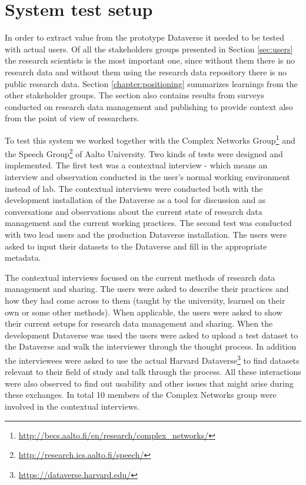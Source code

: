 \section{System test setup}
\label{sec:system_testing}

In order to extract value from the prototype Dataverse it needed to be tested
with actual users. Of all the stakeholders groups presented in Section \ref{sec:users}
the research scientists is the most important one, since without them there is
no research data and without them using the research data repository there is
no public research data. Section \ref{chapter:positioning} summarizes learnings
from the other stakeholder groups. The section also contains results from
surveys conducted on research data management and publishing to provide context
also from the point of view of researchers.

To test this system we worked together with the Complex Networks
Group\footnote{\url{http://becs.aalto.fi/en/research/complex\_networks/}} and the
Speech Group\footnote{\url{http://research.ics.aalto.fi/speech/}} of Aalto
University. Two kinds of tests were designed and implemented. The first test was a contextual
interview - which means an interview and observation conducted in the user's normal working
environment instead of lab. The contextual interviews were conducted both with
the development installation of the Dataverse as a tool for discussion and as
conversations and observations about the current state of research data management and the
current working practices. The second test was conducted with two lead users
and the production Dataverse installation. The users were asked to input their
datasets to the Dataverse and fill in the appropriate metadata.

The contextual interviews focused on the current methods of research data
management and sharing. The users were asked to describe their practices and
how they had come across to them (taught by the university, learned on their
own or some other methods). When applicable, the users were asked to show
their current setups for research data management and sharing. When the
development Dataverse was used the users were asked to upload a test dataset
to the Dataverse and walk the interviewer through the thought process. In
addition the interviewees were asked to use the actual Harvard
Dataverse\footnote{\url{https://dataverse.harvard.edu/}} to find datasets
relevant to their field of study and talk through the process. All these
interactions were also observed to find out usability and other issues that
might arise during these exchanges. In total 10 members of the Complex
Networks group were involved in the contextual interviews.

